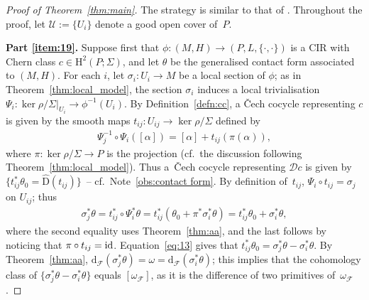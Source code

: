 \documentclass[pdftex]{sigma}
\numberwithin{equation}{section}
\newcommand{\de}{\mathrm{d}} %
\newcommand{\JM}{(P,L,\{\cdot,\cdot\})} %
\newcommand{\CM}{(M,H)} %
\newcommand{\HH}{\mathrm{H}}
\begin{document}
\begin{proof}[Proof of Theorem~\ref{thm:main}] The strategy is similar to that of \cite[Theorems~4.2 and~4.3]{dd}. Throu\-ghout the proof, let $\mathcal{U} := \{U_i\}$ denote a good open cover of~$P$.

{\bf Part \ref{item:19}.} Suppose f\/irst that $\phi\colon \CM \to \JM$ is a CIR with Chern class $c \in \HH^2(P;\Sigma)$, and let $\theta$ be the generalised contact form associated to $\CM$. For each $i$, let $\sigma_i \colon U_i \to M$ be a local section of $\phi$; as in Theorem~\ref{thm:local_model}, the section $\sigma_i$ induces a local trivialisation $\Psi_i \colon \ker \rho/\Sigma|_{U_i} \to \phi^{-1}(U_i)$. By Def\/inition~\ref{defn:cc}, a \v{C}ech cocycle representing $c$ is given by the smooth maps $t_{ij} \colon U_{ij} \to \ker \rho /\Sigma$ def\/ined by
 \begin{gather*}
 \Psi_j^{-1} \circ \Psi_i([\alpha]) = [\alpha] + t_{ij}(\pi(\alpha)),
 \end{gather*}
where $\pi\colon \ker \rho/\Sigma \to P$ is the projection (cf.\ the discussion following Theorem~\ref{thm:local_model}). Thus a~\v{C}ech cocycle representing $\mathcal{D}c$ is given by $\{t_{ij}^*\theta_0 = \hat{\mathrm{D}}(t_{ij})\}$~-- cf.\ Note~\ref{obs:contact form}. By def\/inition of~$t_{ij}$, $\Psi_i \circ t_{ij} = \sigma_j$ on $U_{ij}$; thus
 \begin{gather} \label{eq:13}
 \sigma_j^* \theta =t_{ij}^* \circ \Psi_i^*\theta = t_{ij}^*(\theta_0 + \pi^* \sigma_i^*\theta) = t_{ij}^*\theta_0 + \sigma_i^* \theta,
 \end{gather}
where the second equality uses Theorem~\ref{thm:aa}, and the last follows by noticing that $\pi \circ t_{ij} = {\rm id}$. Equation~\eqref{eq:13} gives that $t_{ij}^*\theta_0 = \sigma_j^*\theta - \sigma_i^*\theta$. By Theorem~\ref{thm:aa}, $\de_{\mathcal{F}}(\sigma_j^* \theta) = \omega = \de_{\mathcal{F}}(\sigma_i^*\theta)$; this implies that the cohomology class of $\{\sigma_j^*\theta - \sigma_i^* \theta\}$ equals $[\omega_{\mathcal{F}}]$, as it is the dif\/ference of two primitives of~$\omega_{\mathcal{F}}$.


\end{proof}
\end{document}
